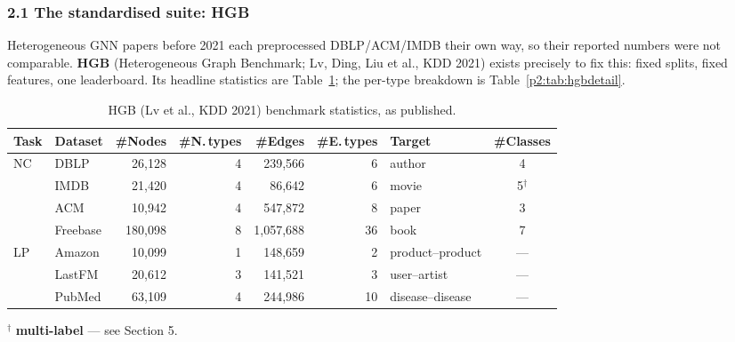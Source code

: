 \subsubsection*{2.1 The standardised suite: HGB}

Heterogeneous GNN papers before 2021 each preprocessed DBLP/ACM/IMDB their own way, so their
reported numbers were not comparable. \textbf{HGB} (Heterogeneous Graph Benchmark; Lv, Ding, Liu
et al., KDD 2021) exists precisely to fix this: fixed splits, fixed features, one leaderboard.
Its headline statistics are Table~\ref{p2:tab:hgb}; the per-type breakdown is
Table~\ref{p2:tab:hgbdetail}.

\begin{table}[htbp]
\centering
\small
\caption{HGB (Lv et al., KDD 2021) benchmark statistics, as published.}
\label{p2:tab:hgb}
\begin{tabular}{llrrrrlc}
\toprule
Task & Dataset & \#Nodes & \#N.\,types & \#Edges & \#E.\,types & Target & \#Classes \\
\midrule
\multirow{4}{*}{NC}
 & DBLP     & 26{,}128  & 4 & 239{,}566   & 6  & author  & 4 \\
 & IMDB     & 21{,}420  & 4 & 86{,}642    & 6  & movie   & 5$^{\dagger}$ \\
 & ACM      & 10{,}942  & 4 & 547{,}872   & 8  & paper   & 3 \\
 & Freebase & 180{,}098 & 8 & 1{,}057{,}688 & 36 & book  & 7 \\
\midrule
\multirow{3}{*}{LP}
 & Amazon   & 10{,}099  & 1 & 148{,}659   & 2  & product--product & --- \\
 & LastFM   & 20{,}612  & 3 & 141{,}521   & 3  & user--artist     & --- \\
 & PubMed   & 63{,}109  & 4 & 244{,}986   & 10 & disease--disease & --- \\
\bottomrule
\end{tabular}

\vspace{2pt}
{\footnotesize $^{\dagger}$ \textbf{multi-label} --- see Section 5.}
\end{table}


